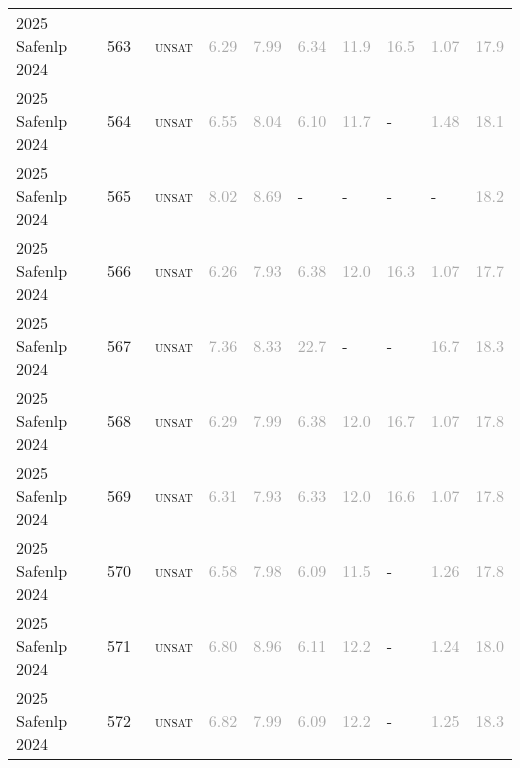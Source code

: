 \begin{center}
{\begin{longtable}{@{}llllllllll@{}}
2025 Safenlp 2024 & 563 & ~\textsc{unsat} & \textcolor{darkgray}{6.29} & \textcolor{darkgray}{7.99} & \textcolor{darkgray}{6.34} & \textcolor{darkgray}{11.9} & \textcolor{darkgray}{16.5} & \textcolor{darkgray}{1.07} & \textcolor{darkgray}{17.9} \\
2025 Safenlp 2024 & 564 & ~\textsc{unsat} & \textcolor{darkgray}{6.55} & \textcolor{darkgray}{8.04} & \textcolor{darkgray}{6.10} & \textcolor{darkgray}{11.7} & - & \textcolor{darkgray}{1.48} & \textcolor{darkgray}{18.1} \\
2025 Safenlp 2024 & 565 & ~\textsc{unsat} & \textcolor{darkgray}{8.02} & \textcolor{darkgray}{8.69} & - & - & - & - & \textcolor{darkgray}{18.2} \\
2025 Safenlp 2024 & 566 & ~\textsc{unsat} & \textcolor{darkgray}{6.26} & \textcolor{darkgray}{7.93} & \textcolor{darkgray}{6.38} & \textcolor{darkgray}{12.0} & \textcolor{darkgray}{16.3} & \textcolor{darkgray}{1.07} & \textcolor{darkgray}{17.7} \\
2025 Safenlp 2024 & 567 & ~\textsc{unsat} & \textcolor{darkgray}{7.36} & \textcolor{darkgray}{8.33} & \textcolor{darkgray}{22.7} & - & - & \textcolor{darkgray}{16.7} & \textcolor{darkgray}{18.3} \\
2025 Safenlp 2024 & 568 & ~\textsc{unsat} & \textcolor{darkgray}{6.29} & \textcolor{darkgray}{7.99} & \textcolor{darkgray}{6.38} & \textcolor{darkgray}{12.0} & \textcolor{darkgray}{16.7} & \textcolor{darkgray}{1.07} & \textcolor{darkgray}{17.8} \\
2025 Safenlp 2024 & 569 & ~\textsc{unsat} & \textcolor{darkgray}{6.31} & \textcolor{darkgray}{7.93} & \textcolor{darkgray}{6.33} & \textcolor{darkgray}{12.0} & \textcolor{darkgray}{16.6} & \textcolor{darkgray}{1.07} & \textcolor{darkgray}{17.8} \\
2025 Safenlp 2024 & 570 & ~\textsc{unsat} & \textcolor{darkgray}{6.58} & \textcolor{darkgray}{7.98} & \textcolor{darkgray}{6.09} & \textcolor{darkgray}{11.5} & - & \textcolor{darkgray}{1.26} & \textcolor{darkgray}{17.8} \\
2025 Safenlp 2024 & 571 & ~\textsc{unsat} & \textcolor{darkgray}{6.80} & \textcolor{darkgray}{8.96} & \textcolor{darkgray}{6.11} & \textcolor{darkgray}{12.2} & - & \textcolor{darkgray}{1.24} & \textcolor{darkgray}{18.0} \\
2025 Safenlp 2024 & 572 & ~\textsc{unsat} & \textcolor{darkgray}{6.82} & \textcolor{darkgray}{7.99} & \textcolor{darkgray}{6.09} & \textcolor{darkgray}{12.2} & - & \textcolor{darkgray}{1.25} & \textcolor{darkgray}{18.3} \\

\end{longtable}}
\end{center}
